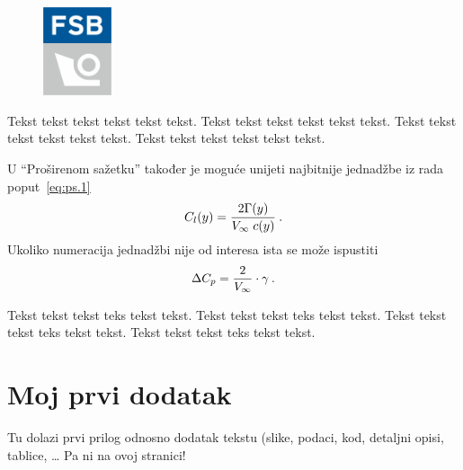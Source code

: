 \documentclass[a4paper,12pt]{report}
\def\Vinf{\hbox{$V_{\infty}$}} %
\begin{document}
\begin{prosirenisazetak}
\begin{figure}
  \centering
  \includegraphics[height=2.6cm]{fsb_logo_v}\\
\end{figure}

Tekst tekst tekst tekst tekst tekst.
Tekst tekst tekst tekst tekst tekst.
Tekst tekst tekst tekst tekst tekst.
Tekst tekst tekst tekst tekst tekst.

U ``Proširenom sažetku'' također je moguće unijeti najbitnije jednadžbe iz
rada poput~\eqref{eq:ps.1}
\begin{equation}\label{eq:ps.1}
	C_l(y)=\frac{2\Gamma(y)}{\Vinf\;c(y)}\:.
\end{equation}
Ukoliko numeracija jednadžbi nije od interesa ista se može ispustiti
\[
\Delta C_p=\frac{2}{\Vinf}\cdot\gamma\:.
\]


Tekst tekst tekst teks tekst tekst.
Tekst tekst tekst teks tekst tekst.
Tekst tekst tekst teks tekst tekst.
Tekst tekst tekst teks tekst tekst.
\end{prosirenisazetak}


\clearpage
{} %








\appendix
\chapter{Moj prvi dodatak}
Tu dolazi prvi prilog odnosno dodatak tekstu (slike, podaci, kod, detaljni
opisi, tablice, \ldots
\newpage 
Pa ni na ovoj stranici!
\end{document}
